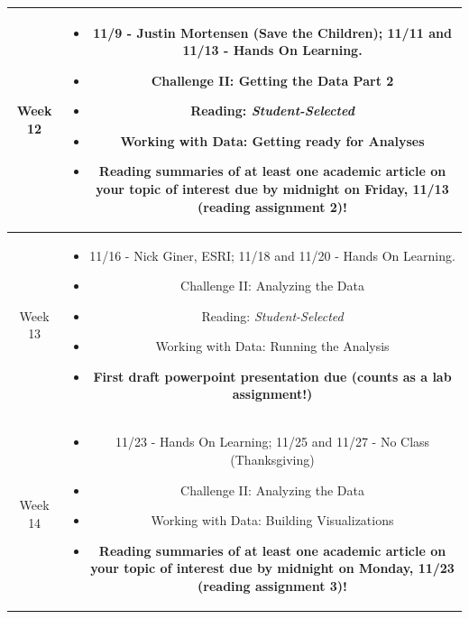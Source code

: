 \documentclass[11pt]{article}
\begin{document}
\begin{table}[h!]
\begin{tabular}{ | c | c | }
Week 12 & \begin{minipage}{.85\textwidth}
\begin{itemize} \itemsep-0.4em
	\vspace{1mm}
	\item 11/9 - Justin Mortensen (Save the Children); 11/11 and 11/13 - Hands On Learning.
	\item Challenge II: Getting the Data Part 2
	\item Reading: \textit{Student-Selected}
	\item Working with Data: Getting ready for Analyses
	\item \textbf{Reading summaries of at least one academic article on your topic of interest due by midnight on Friday, 11/13 (reading assignment 2)!}
	\vspace{1mm}
\end{itemize}
\end{minipage} \\
\hline

Week 13 & \begin{minipage}{.85\textwidth}
\begin{itemize} \itemsep-0.4em
	\vspace{1mm}
	\item 11/16 - Nick Giner, ESRI; 11/18 and 11/20 - Hands On Learning.
	\item Challenge II: Analyzing the Data
	\item Reading: \textit{Student-Selected}
	\item Working with Data: Running the Analysis
	\item \textbf{First draft powerpoint presentation due (counts as a lab assignment!)}
	\vspace{1mm}
\end{itemize}
\end{minipage} \\
\hline

Week 14 & \begin{minipage}{.85\textwidth}
\begin{itemize} \itemsep-0.4em
	\vspace{1mm}
	\item 11/23 - Hands On Learning; 11/25 and 11/27 - No Class (Thanksgiving)
	\item Challenge II: Analyzing the Data
	\item Working with Data: Building Visualizations
	\item \textbf{Reading summaries of at least one academic article on your topic of interest due by midnight on Monday, 11/23 (reading assignment 3)!}
	\vspace{1mm}
\end{itemize}
\end{minipage} \\
\hline


\end{tabular}
\end{table}
\end{document}
